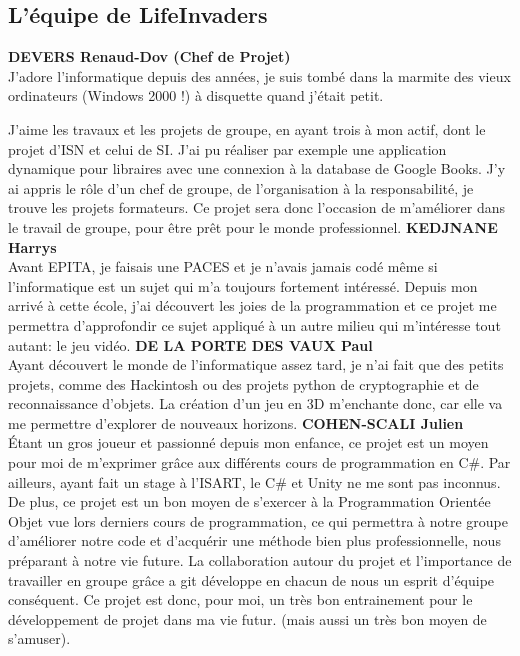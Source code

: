 \documentclass[french, 12pt]{article}
\begin{document}
\subsection{L'équipe de LifeInvaders}
\textbf{DEVERS Renaud-Dov (Chef de Projet)} \\
J'adore l'informatique depuis des années, je suis tombé dans la marmite des vieux ordinateurs (Windows 2000 !) à disquette quand j'était petit.

J'aime les travaux et les projets de groupe, en ayant trois à mon actif, dont le projet d'ISN et celui de SI. J'ai pu réaliser par exemple une application dynamique pour libraires avec une connexion à la database de Google Books.
J'y ai appris le rôle d'un chef de groupe, de l'organisation à la responsabilité, je trouve les projets formateurs.
Ce projet sera donc l'occasion de m'améliorer dans le travail de groupe, pour être prêt pour le monde professionnel.
\newline
\textbf{KEDJNANE Harrys} \\
Avant EPITA, je faisais une PACES et je n’avais jamais codé 
même si l’informatique est un sujet qui m’a toujours fortement intéressé. 
Depuis mon arrivé à cette école, j’ai découvert les joies de la programmation 
et ce projet me permettra d’approfondir ce sujet appliqué à un autre milieu 
qui m’intéresse tout autant: le jeu vidéo. 
\newline
\textbf{DE LA PORTE DES VAUX Paul} \\
Ayant découvert le monde de l’informatique assez tard, je n’ai fait que des petits projets, comme des Hackintosh ou des projets python de cryptographie et de reconnaissance d’objets.
La création d’un jeu en 3D m’enchante donc, car elle va me permettre d’explorer de nouveaux horizons.
\newline
\textbf{COHEN-SCALI Julien} \\
Étant un gros joueur et passionné depuis mon enfance, ce projet est un moyen pour moi de m’exprimer grâce aux différents cours de programmation en C\#.
Par ailleurs, ayant fait un stage à l’ISART, le C\# et Unity ne me sont pas inconnus. De plus, ce projet est un bon moyen de s’exercer à la Programmation Orientée Objet vue lors derniers cours de programmation,
ce qui permettra à notre groupe d’améliorer notre code et d’acquérir une méthode bien plus professionnelle, nous préparant à notre vie future.
La collaboration autour du projet et l’importance de travailler en groupe grâce a git développe en chacun de nous un esprit d’équipe conséquent.
Ce projet est donc, pour moi, un très bon entrainement pour le développement de projet dans ma vie futur. (mais aussi un très bon moyen de s’amuser).
\end{document}
